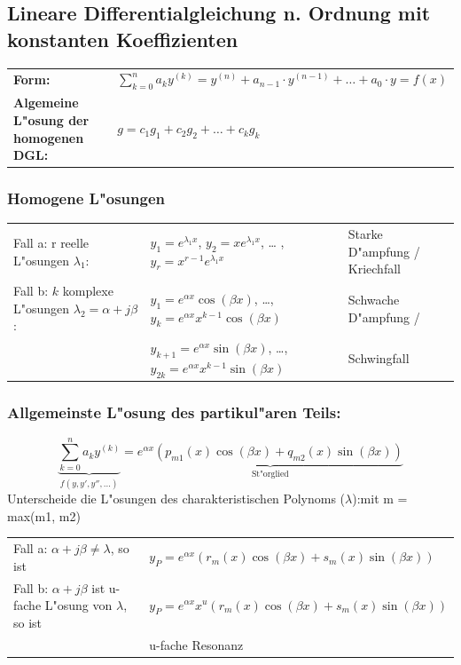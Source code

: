 \subsection{Lineare Differentialgleichung n. Ordnung mit konstanten 
Koeffizienten }
\begin{tabular}{p{8cm}p{8cm}}
\textbf{Form:} &
$\sum\limits_{k=0}^na_ky^{(k)}= y^{(n)}+a_{n-1}\cdot y^{(n-1)}+\ldots +a_0\cdot y=f(x)$\\
\textbf{Algemeine L"osung der homogenen DGL:} &
$g=c_1g_1+c_2g_2+\ldots +c_kg_k$\\
\end{tabular}

\subsubsection{Homogene L"osungen}
\begin{tabular}{lll}
Fall a: r reelle L"osungen $\lambda_1$: 
  & $y_1=e^{\lambda_1x}$, $y_2=xe^{\lambda_1x}$, \ldots
  ,$y_r=x^{r-1}e^{\lambda_1x}$ 
  & Starke D"ampfung / Kriechfall\\
Fall b: $k$ komplexe L"osungen $\lambda_2=\alpha +j\beta$: 
  &$y_1=e^{\alpha x}\cos(\beta x)$, \ldots, $y_k=e^{\alpha x}x^{k-1}\cos(\beta
x)$
  & Schwache D"ampfung /\\
  &$y_{k+1}=e^{\alpha x}\sin(\beta x)$, \ldots, $y_{2k}=e^{\alpha
x}x^{k-1}\sin(\beta x)$
  & Schwingfall\\
\end{tabular}

\subsubsection{Allgemeinste L"osung des partikul"aren Teils:}
$$\underbrace{\sum_{k=0}^n a_k y^{(k)}}_{f(y,y',y'',\ldots)} = \underbrace{e^{\alpha x} (p_{m1}(x) \cos (\beta x) + q_{m2}(x) \sin (\beta x))}_{\text{St"orglied}}$$
Unterscheide die L"osungen des charakteristischen Polynoms
($\lambda$):\hspace{5.5cm}mit m = max(m1, m2)\\
\begin{tabular}{p{8cm}p{8.5cm}}
Fall a: $\alpha + j\beta \neq \lambda$, so ist &
$y_P = e^{\alpha x}(r_m(x)\cos(\beta x) + s_m(x) \sin(\beta x))$\\
Fall b: $\alpha + j\beta$  ist u-fache L"osung von $\lambda$, so ist &
$y_P = e^{\alpha x} x^u (r_m(x) \cos(\beta x) + s_m(x) \sin(\beta x))$\\
&
u-fache Resonanz

\end{tabular}

